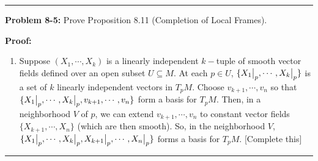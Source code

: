 \documentclass{article}
\newcommand{\restr}[2]{{%
  \left.\kern-\nulldelimiterspace %
  #1 %
  \vphantom{\big|} %
  \right|_{#2} %
  }}
\begin{document}
\vskip 0.5cm
\hrule
\vskip 0.5cm



\textbf{Problem 8-5:} Prove Proposition 8.11 (Completion of Local Frames).
\vskip 0.5cm

\textbf{Proof:}
\begin{enumerate}[label=(\alph*)]
  \item Suppose $\left(X_1, \cdots, X_k\right)$ is a linearly independent $k-$tuple of smooth vector fields defined over an open subset $U \subseteq M$. At each $p \in U$, $\{\restr{X_1}{p},\cdots, \restr{X_k}{p}\}$ is a set of $k$ linearly independent vectors in $T_p M$. Choose $v_{k+1}, \cdots, v_n$ so that $\{\restr{X_1}{p},\cdots, \restr{X_k}{p}, v_{k+1}, \cdots, v_n \}$ form a basis for $T_p M$. 
  \vskip 0.25cm Then, in a neighborhood $V$ of $p$, we can extend $v_{k+1}, \cdots, v_n$ to constant vector fields $\{X_{k+1},\cdots, X_n\}$ (which are then smooth). So, in the neighborhood $V$, $\{\restr{X_1}{p},\cdots, \restr{X_k}{p}, \restr{X_{k+1}}{p},\cdots, \restr{X_n}{p} \}$ forms a basis for $T_p M$. [Complete this]
\end{enumerate}


\vskip 0.5cm
\hrule
\vskip 0.5cm








\end{document}
